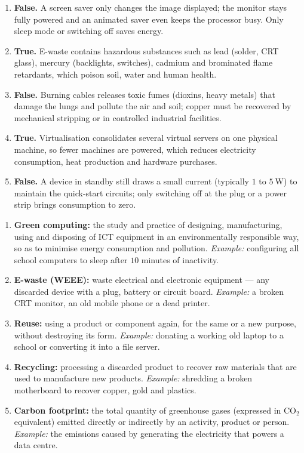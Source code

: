 \documentclass[11pt]{article}
\begin{document}
\begin{corrige}
\begin{enumerate}
\item \textbf{False.} A screen saver only changes the image displayed; the monitor stays fully powered and an animated saver even keeps the processor busy. Only sleep mode or switching off saves energy.
\item \textbf{True.} E-waste contains hazardous substances such as lead (solder, CRT glass), mercury (backlights, switches), cadmium and brominated flame retardants, which poison soil, water and human health.
\item \textbf{False.} Burning cables releases toxic fumes (dioxins, heavy metals) that damage the lungs and pollute the air and soil; copper must be recovered by mechanical stripping or in controlled industrial facilities.
\item \textbf{True.} Virtualisation consolidates several virtual servers on one physical machine, so fewer machines are powered, which reduces electricity consumption, heat production and hardware purchases.
\item \textbf{False.} A device in standby still draws a small current (typically $1$ to $5\ \mathrm{W}$) to maintain the quick-start circuits; only switching off at the plug or a power strip brings consumption to zero.
\end{enumerate}
\end{corrige}

\begin{corrige}
\begin{enumerate}
\item \textbf{Green computing:} the study and practice of designing, manufacturing, using and disposing of ICT equipment in an environmentally responsible way, so as to minimise energy consumption and pollution. \emph{Example:} configuring all school computers to sleep after $10$ minutes of inactivity.
\item \textbf{E-waste (WEEE):} waste electrical and electronic equipment --- any discarded device with a plug, battery or circuit board. \emph{Example:} a broken CRT monitor, an old mobile phone or a dead printer.
\item \textbf{Reuse:} using a product or component again, for the same or a new purpose, without destroying its form. \emph{Example:} donating a working old laptop to a school or converting it into a file server.
\item \textbf{Recycling:} processing a discarded product to recover raw materials that are used to manufacture new products. \emph{Example:} shredding a broken motherboard to recover copper, gold and plastics.
\item \textbf{Carbon footprint:} the total quantity of greenhouse gases (expressed in $\mathrm{CO_2}$ equivalent) emitted directly or indirectly by an activity, product or person. \emph{Example:} the emissions caused by generating the electricity that powers a data centre.
\end{enumerate}
\end{corrige}
\end{document}
